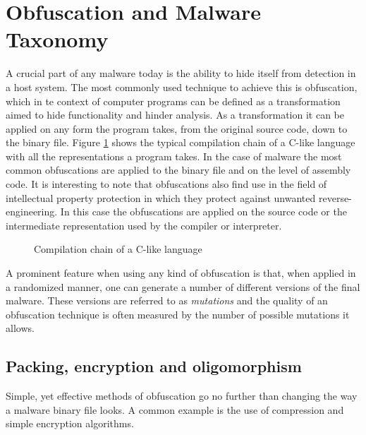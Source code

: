 \section{Obfuscation and Malware Taxonomy}
A crucial part of any malware today is the ability to hide itself from detection in a host system. The most commonly used technique to achieve this is obfuscation, which in te context of computer programs can be defined as a transformation aimed to hide functionality and hinder analysis. As a transformation it can be applied on any form the program takes, from the original source code, down to the binary file. Figure \ref{fig_comp} shows the typical compilation chain of a C-like language with all the representations a program takes. In the case of malware the most common obfuscations are applied to the binary file and on the level of assembly code. It is interesting to note that obfuscations also find use in the field of intellectual property protection in which they protect against unwanted reverse-engineering. In this case the obfuscations are applied on the source code or the intermediate representation used by the compiler or interpreter.

\begin{figure}[H]
    \centering
    \caption{Compilation chain of a C-like language}
    \label{fig_comp}
\end{figure}

A prominent feature when using any kind of obfuscation is that, when applied in a randomized manner, one can generate a number of different versions of the final malware. These versions are referred to as \emph{mutations} and the quality of an obfuscation technique is often measured by the number of possible mutations it allows.

\subsection{Packing, encryption and oligomorphism}
Simple, yet effective methods of obfuscation go no further than changing the way a malware binary file looks. A common example is the use of compression and simple encryption algorithms.


